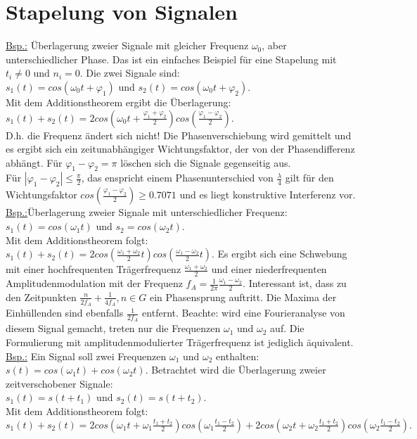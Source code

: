 \chapter{Stapelung von Signalen}

\underline{Bsp.:} Überlagerung zweier Signale mit gleicher Frequenz $\omega_0$, aber unterschiedlicher Phase.  Das ist ein einfaches Beispiel für eine Stapelung mit $t_i\not= 0$ und $n_i=0$. Die zwei Signale sind:\\
$s_1(t)=cos(\omega_0 t+\varphi_1)$ und $s_2(t)=cos(\omega_0 t+\varphi_2)$.\\
Mit dem Additionstheorem ergibt die Überlagerung:\\
$s_1(t)+s_2(t)=2cos(\omega_0 t + \frac {\varphi_1 + \varphi_2}{2})cos(\frac {\varphi_1 - \varphi_2}{2})$.\\
D.h. die Frequenz ändert sich nicht! Die Phasenverschiebung wird gemittelt und es ergibt sich ein zeitunabhängiger Wichtungsfaktor, der von der Phasendifferenz abhängt. Für $\varphi_1-\varphi_2= \pi $ löschen sich die Signale gegenseitig aus.\\
Für $|\varphi_1-\varphi_2|\le \frac{\pi}{2}$, das enspricht einem Phasenunterschied von $\frac{\lambda}{4}$ gilt für den Wichtungsfaktor $cos(\frac{\varphi_1-\varphi_2}{2})\ge 0.7071$ und es liegt konstruktive Interferenz vor.\\ 

\underline{Bsp.:}Überlagerung zweier Signale mit unterschiedlicher Frequenz:\\
$s_1(t)=cos(\omega_1 t)$ und $s_2=cos(\omega_2 t)$.\\
Mit dem Additionstheorem folgt:\\
 $s_1(t)+s_2(t)= 2 cos(\frac{\omega_1+\omega_2}{2}t)cos(\frac{\omega_1-\omega_2}{2}t)$.
Es ergibt sich eine Schwebung mit einer hochfrequenten Trägerfrequenz $\frac{\omega_1+\omega_2}{2}$ und einer niederfrequenten Amplitudenmodulation mit der Frequenz $f_A = \frac{1}{2\pi}\frac{\omega_1-\omega_2}{2}$. Interessant ist, dass zu den Zeitpunkten $\frac{n}{2f_A}+\frac{1}{4f_A}, n \in G$ ein Phasensprung auftritt. Die Maxima der Einhüllenden sind ebenfalls $\frac{1}{2f_A}$ entfernt. Beachte: wird eine Fourieranalyse von diesem Signal gemacht, treten nur die Frequenzen $\omega_1$ und $\omega_2$ auf. Die Formulierung mit amplitudenmodulierter Trägerfrequenz ist jediglich äquivalent.\\ 

\underline{Bsp.:} Ein Signal soll zwei Frequenzen $\omega_1$ und $\omega_2$ enthalten: $s(t) = cos(\omega_1t) + cos(\omega_2t)$. Betrachtet wird die Überlagerung zweier zeitverschobener Signale: \\
$s_1(t)=s(t+t_1)$ und $s_2(t)=s(t+t_2)$.\\
Mit dem Additionstheorem folgt:\\
 $s_1(t)+s_2(t)= 2 cos(\omega_1 t +\omega_1\frac{t_1+t_2}{2})cos(\omega_1\frac{t_1-t_2}{2})+2 cos(\omega_2 t +\omega_2\frac{t_1+t_2}{2})cos(\omega_2\frac{t_1-t_2}{2}).$
\\ 

